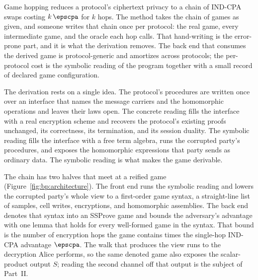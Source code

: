 Game hopping reduces a protocol's ciphertext privacy to a chain of IND-CPA swaps
costing $k\,\epscpa$ for $k$ hops. The method takes the chain of games as given,
and someone writes that chain once per protocol: the real game, every
intermediate game, and the oracle each hop calls. That hand-writing is the
error-prone part, and it is what the derivation removes. The back end that
consumes the derived game is protocol-generic and amortizes across protocols; the
per-protocol cost is the symbolic reading of the program together with a small
record of declared game configuration.

The derivation rests on a single idea. The protocol's procedures are written
once over an interface that names the message carriers and the homomorphic
operations and leaves their laws open. The concrete reading fills the interface
with a real encryption scheme and recovers the protocol's existing proofs
unchanged, its correctness, its termination, and its session duality. The
symbolic reading fills the interface with a free term algebra, runs the
corrupted party's procedures, and exposes the homomorphic expressions that party
sends as ordinary data. The symbolic reading is what makes the game derivable.

The chain has two halves that meet at a reified game
(Figure~\ref{fig:bp:architecture}). The front end runs the symbolic reading and
lowers the corrupted party's whole view to a first-order game syntax, a
straight-line list of samples, cell writes, encryptions, and homomorphic
assemblies. The back end denotes that syntax into an SSProve game and bounds the
adversary's advantage with one lemma that holds for every well-formed game in the
syntax. That bound is the number of encryption hops the game contains times the
single-hop IND-CPA advantage $\epscpa$. The walk that produces the view runs to
the decryption Alice performs, so the same denoted game also exposes the
scalar-product output $S$; reading the second channel off that output is the
subject of Part~II.

